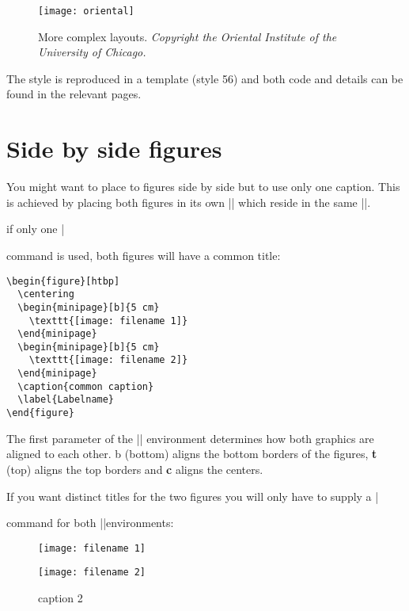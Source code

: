\begin{figure}[p]
\centering
\texttt{[image: oriental]}
\caption{More complex layouts. \emph{Copyright the Oriental Institute of the University of Chicago.}}
\label{complex}
\end{figure}

The style is reproduced in a  template (style 56) and both code and details can be found in the relevant pages.





\section{Side by side figures}

You might want to place to figures side by side but to use only one caption. This is achieved by placing both figures in its own |\minipage| which reside in the same |\figure|.

if only one |\caption| command is used, both figures will have a common title:

\medskip
\begin{verbatim}
\begin{figure}[htbp]
  \centering
  \begin{minipage}[b]{5 cm}
    \texttt{[image: filename 1]}  
  \end{minipage}
  \begin{minipage}[b]{5 cm}
    \texttt{[image: filename 2]}  
  \end{minipage}
  \caption{common caption}
  \label{Labelname}
\end{figure}
\end{verbatim}
\medskip

The first parameter of the |\minipage| environment determines how both graphics are aligned to each other. b (bottom) aligns the bottom borders of the figures, \textbf{t} (top) aligns the top borders and \textbf{c} aligns the centers.

If you want distinct titles for the two figures you will only have to supply a |\caption| command for both |\minipage|environments:

\begin{teX}
\begin{figure}[htbp]
  \centering
  \begin{minipage}[b]{5 cm}
    \texttt{[image: filename 1]} 
    \caption{caption 1}
    \label{labelname 1}
  \end{minipage}
  \begin{minipage}[b]{5 cm}
    \texttt{[image: filename 2]}  
    \caption{caption 2}
    \label{labelname 2}
  \end{minipage}
\end{figure}
\end{teX}


